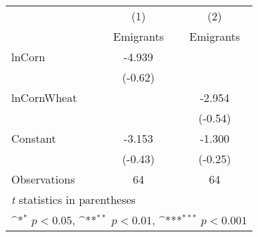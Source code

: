 {
\def\sym#1{\ifmmode^{#1}\else\(^{#1}\)\fi}
\begin{tabular}{l*{2}{c}}
\toprule
                    &\multicolumn{1}{c}{(1)}&\multicolumn{1}{c}{(2)}\\
                    &\multicolumn{1}{c}{Emigrants}&\multicolumn{1}{c}{Emigrants}\\
\midrule
lnCorn              &      -4.939         &                     \\
                    &     (-0.62)         &                     \\
\addlinespace
lnCornWheat         &                     &      -2.954         \\
                    &                     &     (-0.54)         \\
\addlinespace
Constant            &      -3.153         &      -1.300         \\
                    &     (-0.43)         &     (-0.25)         \\
\midrule
Observations        &          64         &          64         \\
\bottomrule
\multicolumn{3}{l}{\footnotesize \textit{t} statistics in parentheses}\\
\multicolumn{3}{l}{\footnotesize \sym{*} \(p<0.05\), \sym{**} \(p<0.01\), \sym{***} \(p<0.001\)}\\
\end{tabular}
}
